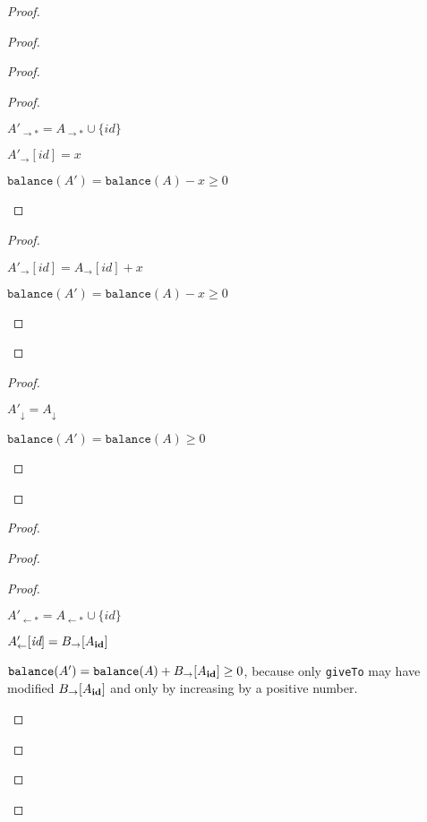 \documentclass[9pt, oneside]{article}   	%
\begin{document}
\begin{proof}
	\begin{proof}
		\begin{proof}
			\begin{proof}
				\begin{pfenum}
					\item $A'_{\rightarrow *} = A_{\rightarrow *} \cup \{ \textit{id} \}$
					\item $A'_\rightarrow [\textit{id}] = x$
					\item $\texttt{balance}(A') = \texttt{balance}(A) - x \geq 0$
				\end{pfenum}
			\end{proof}
			
			\begin{proof}
				\begin{pfenum}
					\item $A'_\rightarrow [\textit{id}] = A_\rightarrow [\textit{id}] + x$
					\item $\texttt{balance}(A') = \texttt{balance}(A) - x \geq 0$
				\end{pfenum}
			\end{proof}
		\end{proof}
		
		\begin{proof}
			\begin{pfenum}
				\item $A'_\downarrow = A_\downarrow$
				\item $\texttt{balance}(A') = \texttt{balance}(A) \geq 0$
			\end{pfenum}
		\end{proof}		
	\end{proof}
	
	\begin{proof}
		\begin{proof}
			\begin{proof}
				\begin{pfenum}
					\item $A'_{\leftarrow *} = A_{\leftarrow *} \cup \{ \textit{id} \}$
					\item $A'_\leftarrow [\textit{id}] = B_{\rightarrow}[A_{\scriptsize\textbf{id}}]$
					\item $\texttt{balance}(A') = \texttt{balance}(A) +  B_{\rightarrow}[A_{\scriptsize\textbf{id}}] \geq 0$, because only \texttt{giveTo} may have modified $B_{\rightarrow}[A_{\scriptsize\textbf{id}}]$ and only by increasing by a positive number. 
				\end{pfenum}
			\end{proof}
			

\end{proof}
\end{proof}
\end{proof}
\end{document}
